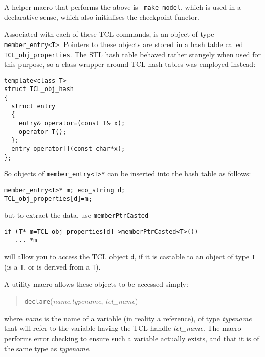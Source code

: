 A helper macro that performs the above is {\tt
  make\_model}, which is used in a declarative
sense, which also initialises the checkpoint functor.


Associated with each of these TCL commands, is an object of type
\verb+member_entry<T>+. Pointers to these objects
are stored in a hash table called
\verb+TCL_obj_properties+. The STL hash
table behaved rather stangely when used for this purpose, so a class
wrapper around TCL hash tables was employed instead:
\begin{verbatim}
template<class T>
struct TCL_obj_hash
{
  struct entry 
  {
    entry& operator=(const T& x);
    operator T();
  };
  entry operator[](const char*x);
};
\end{verbatim}
So objects of \verb+member_entry<T>*+ can be inserted into the hash
table as follows:
\begin{verbatim}
member_entry<T>* m; eco_string d;
TCL_obj_properties[d]=m;
\end{verbatim}
but to extract the data, use \verb+memberPtrCasted+
\begin{verbatim}
if (T* m=TCL_obj_properties[d]->memberPtrCasted<T>())
   ... *m 
\end{verbatim}
will allow you to access the TCL object \verb+d+, if it is castable to
an object of type \verb+T+ (is a \verb+T+, or is derived from a \verb+T+). 

A utility macro allows these objects to be accessed simply:
\begin{verse}
{\tt declare}({\em name},{\em typename}, {\em tcl\_name})
\end{verse}
where {\em name} is the name of a variable (in reality a reference),
of type {\em typename} that will refer to the variable having the TCL
handle {\em tcl\_name}. The macro performs error checking to ensure
such a variable actually exists, and that it is of the same type as
{\em typename}.

